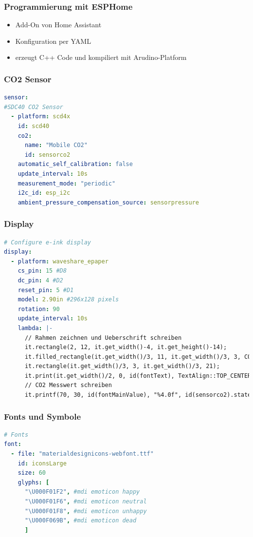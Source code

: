 \documentclass[aspectratio=169,svgnames]{beamer}
\begin{document}
\begin{frame}
    \frametitle{Programmierung mit ESPHome}
    \begin{itemize}[<+->]
        \item Add-On von Home Assistant
        \item Konfiguration per YAML
        \item erzeugt C++ Code und kompiliert mit Arudino-Platform
    \end{itemize}
\end{frame}

\begin{frame}[fragile]
    \frametitle{CO2 Sensor}
    \footnotesize
\begin{lstlisting}[language=yaml]
sensor:
#SDC40 CO2 Sensor
  - platform: scd4x
    id: scd40
    co2:
      name: "Mobile CO2"
      id: sensorco2                                                              
    automatic_self_calibration: false
    update_interval: 10s
    measurement_mode: "periodic"
    i2c_id: esp_i2c
    ambient_pressure_compensation_source: sensorpressure
\end{lstlisting}
\end{frame}

\begin{frame}[fragile]
    \frametitle{Display}
    \footnotesize
\begin{lstlisting}[language=yaml]
# Configure e-ink display
display:
  - platform: waveshare_epaper
    cs_pin: 15 #D8
    dc_pin: 4 #D2
    reset_pin: 5 #D1
    model: 2.90in #296x128 pixels
    rotation: 90
    update_interval: 10s
    lambda: |-
      // Rahmen zeichnen und Ueberschrift schreiben
      it.rectangle(2, 12, it.get_width()-4, it.get_height()-14);
      it.filled_rectangle(it.get_width()/3, 11, it.get_width()/3, 3, COLOR_OFF);
      it.rectangle(it.get_width()/3, 3, it.get_width()/3, 21);
      it.print(it.get_width()/2, 0, id(fontText), TextAlign::TOP_CENTER, "CO2");
      // CO2 Messwert schreiben
      it.printf(70, 30, id(fontMainValue), "%4.0f", id(sensorco2).state);
\end{lstlisting}
\end{frame}

\begin{frame}[fragile]
    \frametitle{Fonts und Symbole}
    \footnotesize
\begin{lstlisting}[language=yaml]
# Fonts
font:
  - file: "materialdesignicons-webfont.ttf"
    id: iconsLarge
    size: 60
    glyphs: [
      "\U000F01F2", #mdi emoticon happy
      "\U000F01F6", #mdi emoticon neutral
      "\U000F01F8", #mdi emoticon unhappy
      "\U000F069B", #mdi emoticon dead
      ]
\end{lstlisting}
\end{frame}
\end{document}
